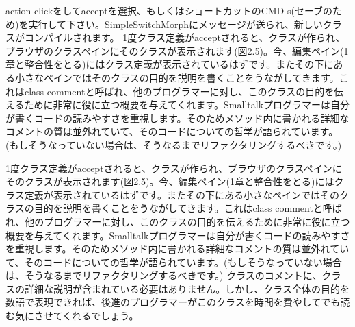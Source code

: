 \documentclass[a4paper,10pt,twoside]{book}
\begin{document}
action-clickをしてacceptを選択、もしくはショートカットのCMD-s(セーブのため)を実行して下さい。SimpleSwitchMorphにメッセージが送られ、新しいクラスがコンパイルされます。
1度クラス定義がacceptされると、クラスが作られ、ブラウザのクラスペインにそのクラスが表示されます(図2.5)。今、編集ペイン(1章と整合性をとる)にはクラス定義が表示されているはずです。またその下にある小さなペインではそのクラスの目的を説明を書くことをうながしてきます。これはclass commentと呼ばれ、他のプログラマーに対し、このクラスの目的を伝えるために非常に役に立つ概要を与えてくれます。Smalltalkプログラマーは自分が書くコードの読みやすさを重視します。そのためメソッド内に書かれる詳細なコメントの質は並外れていて、そのコードについての哲学が語られています。(もしそうなっていない場合は、そうなるまでリファクタリングするべきです。)

1度クラス定義がacceptされると、クラスが作られ、ブラウザのクラスペインにそのクラスが表示されます(図2.5)。今、編集ペイン(1章と整合性をとる)にはクラス定義が表示されているはずです。またその下にある小さなペインではそのクラスの目的を説明を書くことをうながしてきます。これはclass commentと呼ばれ、他のプログラマーに対し、このクラスの目的を伝えるために非常に役に立つ概要を与えてくれます。Smalltalkプログラマーは自分が書くコードの読みやすさを重視します。そのためメソッド内に書かれる詳細なコメントの質は並外れていて、そのコードについての哲学が語られています。(もしそうなっていない場合は、そうなるまでリファクタリングするべきです。)
クラスのコメントに、クラスの詳細な説明が含まれている必要はありません。しかし、クラス全体の目的を数語で表現できれば、後進のプログラマーがこのクラスを時間を費やしてでも読む気にさせてくれるでしょう。

\end{document}
